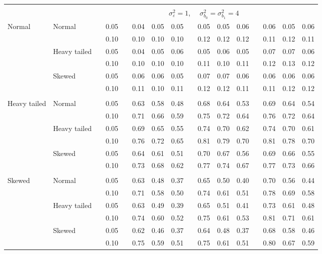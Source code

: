 \documentclass{article} %
\begin{document}
\begin{table}[ht]
\begin{scriptsize}
\begin{center}
\begin{tabular}{ll p{.1cm} c p{.1cm} rrr p{.1cm} rrr p{.1cm} rrr}
&&&&&&&&&&&&&&&\\
& && && \multicolumn{9}{c}{$\sigma_{\varepsilon}^2 = 1$, \ \ $\sigma_{b_0}^2 = \sigma_{b_1}^2 = 4$} \\ \cline{6-16}
\rowcolor{gray!20}Normal       & Normal       && 0.05 &&   0.04 & 0.05 & 0.05 && 0.05 & 0.05 & 0.06 && 0.06 & 0.05 & 0.06 \\ 
\rowcolor{gray!20}             &              && 0.10 &&   0.10 & 0.10 & 0.10 && 0.12 & 0.12 & 0.12 && 0.11 & 0.12 & 0.11 \\ 
\rowcolor{gray!20}             & Heavy tailed && 0.05 &&   0.04 & 0.05 & 0.06 && 0.05 & 0.06 & 0.05 && 0.07 & 0.07 & 0.06 \\ 
\rowcolor{gray!20}             &              && 0.10 &&   0.10 & 0.10 & 0.10 && 0.11 & 0.10 & 0.11 && 0.12 & 0.13 & 0.12 \\ 
\rowcolor{gray!20}             & Skewed       && 0.05 &&   0.06 & 0.06 & 0.05 && 0.07 & 0.07 & 0.06 && 0.06 & 0.06 & 0.06 \\ 
\rowcolor{gray!20}             &              && 0.10 &&   0.11 & 0.10 & 0.11 && 0.12 & 0.12 & 0.11 && 0.11 & 0.12 & 0.12 \\ 
             &&&&&&&&&&&&&&&\\
Heavy tailed & Normal       && 0.05 &&   0.63 & 0.58 & 0.48 && 0.68 & 0.64 & 0.53 && 0.69 & 0.64 & 0.54 \\
             &              && 0.10 &&   0.71 & 0.66 & 0.59 && 0.75 & 0.72 & 0.64 && 0.76 & 0.72 & 0.64 \\
             & Heavy tailed && 0.05 &&   0.69 & 0.65 & 0.55 && 0.74 & 0.70 & 0.62 && 0.74 & 0.70 & 0.61 \\
             &              && 0.10 &&   0.76 & 0.72 & 0.65 && 0.81 & 0.79 & 0.70 && 0.81 & 0.78 & 0.70 \\
             & Skewed       && 0.05 &&   0.64 & 0.61 & 0.51 && 0.70 & 0.67 & 0.56 && 0.69 & 0.66 & 0.55 \\
             &              && 0.10 &&   0.73 & 0.68 & 0.62 && 0.77 & 0.74 & 0.67 && 0.77 & 0.73 & 0.66 \\
             &&&&&&&&&&&&&&&\\
Skewed       & Normal       && 0.05 &&   0.63 & 0.48 & 0.37 && 0.65 & 0.50 & 0.40 && 0.70 & 0.56 & 0.44 \\ 
             &              && 0.10 &&   0.71 & 0.58 & 0.50 && 0.74 & 0.61 & 0.51 && 0.78 & 0.69 & 0.58 \\ 
             & Heavy tailed && 0.05 &&   0.63 & 0.49 & 0.39 && 0.65 & 0.51 & 0.41 && 0.73 & 0.61 & 0.48 \\ 
             &              && 0.10 &&   0.74 & 0.60 & 0.52 && 0.75 & 0.61 & 0.53 && 0.81 & 0.71 & 0.61 \\ 
             & Skewed       && 0.05 &&   0.62 & 0.46 & 0.37 && 0.64 & 0.48 & 0.37 && 0.68 & 0.58 & 0.46 \\ 
             &              && 0.10 &&   0.75 & 0.59 & 0.51 && 0.75 & 0.61 & 0.51 && 0.80 & 0.67 & 0.59 \\ 



\end{tabular}
\end{center}
\end{scriptsize}
\end{table}
\end{document}
